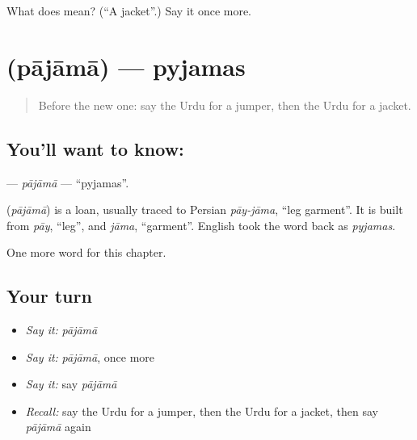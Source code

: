 \begin{tcolorbox}[breakable,colback=teal!4,colframe=teal!35!black,title={Before you move on}]
What does  mean? (\textquotedblleft{}A jacket\textquotedblright{}.) Say it once more.
\end{tcolorbox}
\section[\texorpdfstring{\ur{پاجامہ} (pājāmā)}{پاجامہ (pājāmā)}]{ (pājāmā) — pyjamas}

\label{lesson:UR-C121-pajama}



\begin{quote}
Before the new one: say the Urdu for a jumper, then the Urdu for a jacket.
\end{quote}

\subsection*{You'll want to know: }
\textbf{} — \emph{pājāmā} — \textquotedblleft{}pyjamas\textquotedblright{}.

\begin{cousinweb}
\textbf{} (\emph{pājāmā}) is a loan, usually traced to Persian \emph{pāy-jāma}, \textquotedblleft{}leg garment\textquotedblright{}. It is built from \emph{pāy}, \textquotedblleft{}leg\textquotedblright{}, and \emph{jāma}, \textquotedblleft{}garment\textquotedblright{}. English took the word back as \emph{pyjamas}.
\end{cousinweb}

\begin{grammarlens}[title={What you've built}]
One more word for this chapter.
\end{grammarlens}

\subsection*{Your turn}
\begin{itemize}
\raggedright
  \item \emph{Say it:} \emph{pājāmā}
  \item \emph{Say it:} \emph{pājāmā}, once more
  \item \emph{Say it:} say \emph{pājāmā}
  \item \emph{Recall:} say the Urdu for a jumper, then the Urdu for a jacket, then say \emph{pājāmā} again
\end{itemize}


